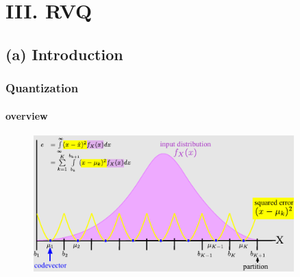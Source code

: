 \section{III. RVQ}
\subsection{(a) Introduction}

\begin{frame}
\frametitle{Quantization}
\framesubtitle{overview}
\logoCSIPCPL\mypagenum
	\begin{figure}				
		\includegraphics[width=0.9\textwidth]{thesis/Quantization_MSE.pdf}
	\end{figure}
\end{frame}





